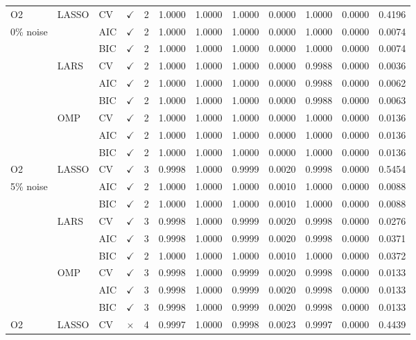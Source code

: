 \documentclass[11pt,a4paper]{article}
\begin{document}
{\begin{longtable}{@{}lllccccccccc@{}}
\midrule
\endhead
\bottomrule
\endfoot
O2 & LASSO & CV & $\checkmark$ & 2 & 1.0000 & 1.0000 & 1.0000 & 0.0000 & 1.0000 & 0.0000 & 0.4196 \\
0\% noise & & AIC & $\checkmark$ & 2 & 1.0000 & 1.0000 & 1.0000 & 0.0000 & 1.0000 & 0.0000 & 0.0074 \\
& & BIC & $\checkmark$ & 2 & 1.0000 & 1.0000 & 1.0000 & 0.0000 & 1.0000 & 0.0000 & 0.0074 \\
& LARS & CV & $\checkmark$ & 2 & 1.0000 & 1.0000 & 1.0000 & 0.0000 & 0.9988 & 0.0000 & 0.0036 \\
& & AIC & $\checkmark$ & 2 & 1.0000 & 1.0000 & 1.0000 & 0.0000 & 0.9988 & 0.0000 & 0.0062 \\
& & BIC & $\checkmark$ & 2 & 1.0000 & 1.0000 & 1.0000 & 0.0000 & 0.9988 & 0.0000 & 0.0063 \\
& OMP & CV & $\checkmark$ & 2 & 1.0000 & 1.0000 & 1.0000 & 0.0000 & 1.0000 & 0.0000 & 0.0136 \\
& & AIC & $\checkmark$ & 2 & 1.0000 & 1.0000 & 1.0000 & 0.0000 & 1.0000 & 0.0000 & 0.0136 \\
& & BIC & $\checkmark$ & 2 & 1.0000 & 1.0000 & 1.0000 & 0.0000 & 1.0000 & 0.0000 & 0.0136 \\ \midrule
O2 & LASSO & CV & $\checkmark$ & 3 & 0.9998 & 1.0000 & 0.9999 & 0.0020 & 0.9998 & 0.0000 & 0.5454 \\
5\% noise & & AIC & $\checkmark$ & 2 & 1.0000 & 1.0000 & 1.0000 & 0.0010 & 1.0000 & 0.0000 & 0.0088 \\
& & BIC & $\checkmark$ & 2 & 1.0000 & 1.0000 & 1.0000 & 0.0010 & 1.0000 & 0.0000 & 0.0088 \\
& LARS & CV & $\checkmark$ & 3 & 0.9998 & 1.0000 & 0.9999 & 0.0020 & 0.9998 & 0.0000 & 0.0276 \\
& & AIC & $\checkmark$ & 3 & 0.9998 & 1.0000 & 0.9999 & 0.0020 & 0.9998 & 0.0000 & 0.0371 \\
& & BIC & $\checkmark$ & 2 & 1.0000 & 1.0000 & 1.0000 & 0.0010 & 1.0000 & 0.0000 & 0.0372 \\
& OMP & CV & $\checkmark$ & 3 & 0.9998 & 1.0000 & 0.9999 & 0.0020 & 0.9998 & 0.0000 & 0.0133 \\
& & AIC & $\checkmark$ & 3 & 0.9998 & 1.0000 & 0.9999 & 0.0020 & 0.9998 & 0.0000 & 0.0133 \\
& & BIC & $\checkmark$ & 3 & 0.9998 & 1.0000 & 0.9999 & 0.0020 & 0.9998 & 0.0000 & 0.0133 \\ \midrule
O2 & LASSO & CV & $\times$ & 4 & 0.9997 & 1.0000 & 0.9998 & 0.0023 & 0.9997 & 0.0000 & 0.4439 \\

\end{longtable}}
\end{document}
